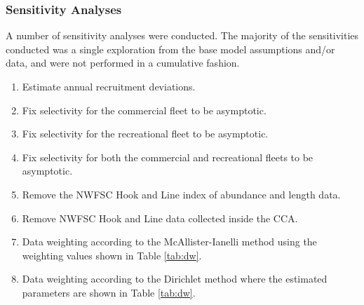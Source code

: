 \documentclass[11pt,
  english,
  a4paper,
]{article}
\begin{document}
\leavevmode\tagmcend\tagstructend\par


\hypertarget{sensitivity-analyses}{%
\subsubsection{Sensitivity Analyses}\label{sensitivity-analyses}}

\leavevmode\tagmcend\tagstructend


A number of sensitivity analyses were conducted. The majority of the sensitivities conducted was a single exploration from the base model assumptions and/or data, and were not performed in a cumulative fashion.

\leavevmode\tagmcend\tagstructend\par

\begin{enumerate}
   
  \item Estimate annual recruitment deviations. 

  \item Fix selectivity for the commercial fleet to be asymptotic. 
  
  \item Fix selectivity for the recreational fleet to be asymptotic. 
    
  \item Fix selectivity for both the commercial and recreational fleets to be asymptotic. 
  
  \item Remove the NWFSC Hook and Line index of abundance and length data. 

  \item Remove NWFSC Hook and Line data collected inside the CCA. 

  \item Data weighting according to the McAllister-Ianelli method using the weighting values shown in Table \ref{tab:dw}. 
  
  \item Data weighting according to the Dirichlet method where the estimated parameters are shown in Table \ref{tab:dw}. 
  
\end{enumerate}

\end{document}
